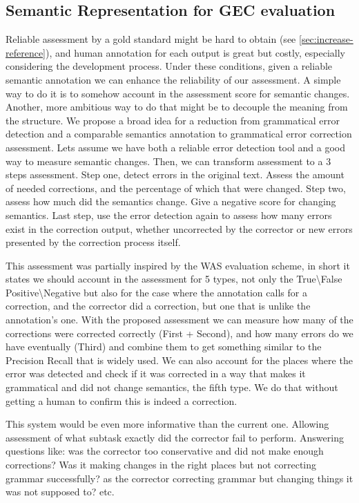 \documentclass[letter,11pt]{article}
\begin{document}
\subsection{Semantic Representation for GEC evaluation}

Reliable assessment by a gold standard might be hard to obtain (see
\ref{sec:increase-reference}), and human annotation for each output
is great \cite{madnani2011they} but costly, especially considering the
development process. Under these conditions,
given a reliable semantic annotation we can enhance the reliability of our assessment. A simple way to do it is to somehow account in the assessment score for semantic changes. 
Another, more ambitious way to do that might be to decouple the meaning
from the structure. We propose a broad idea for a reduction from grammatical
error detection and a comparable semantics annotation to grammatical
error correction assessment. Lets assume we have both a reliable error
detection tool and a good way to measure semantic changes. Then, we
can transform assessment to a 3 steps assessment. 
Step one, detect errors in the original text. Assess the amount of needed corrections, and the percentage of which that were changed.
Step two, assess how much did the semantics change.
 Give a negative score for changing semantics.
Last step, use
the error detection again to assess how many errors exist in the correction
output, whether uncorrected by the corrector or new errors presented
by the correction process itself. 

This assessment was partially inspired by the WAS evaluation scheme\cite{chodorow2012problems},
in short it states we should account in the assessment for 5 types,
not only the True\textbackslash{}False Positive\textbackslash{}Negative
but also for the case where the annotation calls for a correction,
and the corrector did a correction, but one that is unlike the annotation's
one. With the proposed assessment we can measure how many of the corrections
were corrected correctly (First + Second), and how many errors do
we have eventually (Third) and combine them to get something similar
to the Precision Recall that is widely used. We can also account for
the places where the error was detected and check if it was corrected
in a way that makes it grammatical and did not change semantics, the
fifth type. We do that without getting a human to confirm this is
indeed a correction.

This system would be even more informative than the current one. Allowing assessment of
what subtask exactly did the corrector fail to perform. Answering questions
like: was the corrector too conservative and did not make enough corrections?
Was it making changes in the right places but not correcting grammar successfully?
 as the corrector correcting grammar but changing things
it was not supposed to? etc.
\end{document}
